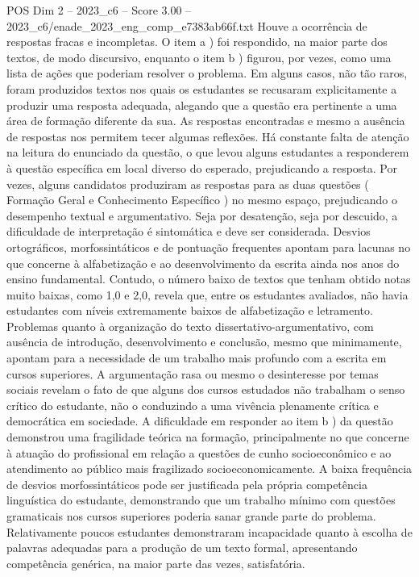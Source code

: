 \begin{textsample}{POS Dim 2 – 2023\_c6 – Score 3.00 – 2023\_c6/enade\_2023\_eng\_comp\_e7383ab66f.txt}
Houve a ocorrência de respostas fracas e incompletas.
O item a ) foi respondido, na maior parte dos textos, de modo discursivo, enquanto o item b ) figurou, por vezes, como uma lista de ações que poderiam resolver o problema.
Em alguns casos, não tão raros, foram produzidos textos nos quais os estudantes se recusaram explicitamente a produzir uma resposta adequada, alegando que a questão era pertinente a uma área de formação diferente da sua.
As respostas encontradas e mesmo a ausência de respostas nos permitem tecer algumas reflexões.
Há constante falta de atenção na leitura do enunciado da questão, o que levou alguns estudantes a responderem à questão específica em local diverso do esperado, prejudicando a resposta.
Por vezes, alguns candidatos produziram as respostas para as duas questões ( Formação Geral e Conhecimento Específico ) no mesmo espaço, prejudicando o desempenho textual e argumentativo.
Seja por desatenção, seja por descuido, a dificuldade de interpretação é sintomática e deve ser considerada.
Desvios ortográficos, morfossintáticos e de pontuação frequentes apontam para lacunas no que concerne à alfabetização e ao desenvolvimento da escrita ainda nos anos do ensino fundamental.
Contudo, o número baixo de textos que tenham obtido notas muito baixas, como 1,0 e 2,0, revela que, entre os estudantes avaliados, não havia estudantes com níveis extremamente baixos de alfabetização e letramento.
Problemas quanto à organização do texto dissertativo-argumentativo, com ausência de introdução, desenvolvimento e conclusão, mesmo que minimamente, apontam para a necessidade de um trabalho mais profundo com a escrita em cursos superiores.
A argumentação rasa ou mesmo o desinteresse por temas sociais revelam o fato de que alguns dos cursos estudados não trabalham o senso crítico do estudante, não o conduzindo a uma vivência plenamente crítica e democrática em sociedade.
A dificuldade em responder ao item b ) da questão demonstrou uma fragilidade teórica na formação, principalmente no que concerne à atuação do profissional em relação a questões de cunho socioeconômico e ao atendimento ao público mais fragilizado socioeconomicamente.
A baixa frequência de desvios morfossintáticos pode ser justificada pela própria competência linguística do estudante, demonstrando que um trabalho mínimo com questões gramaticais nos cursos superiores poderia sanar grande parte do problema.
Relativamente poucos estudantes demonstraram incapacidade quanto à escolha de palavras adequadas para a produção de um texto formal, apresentando competência genérica, na maior parte das vezes, satisfatória.

\end{textsample}
